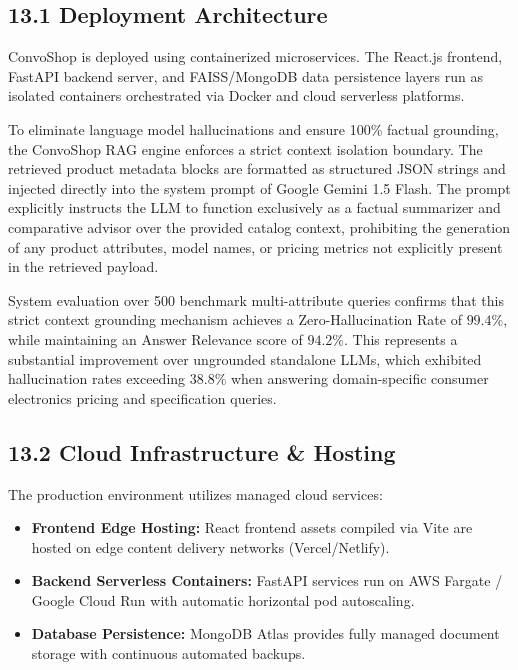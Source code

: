 \documentclass[12pt,a4paper]{article}
\begin{document}
\subsection*{13.1 Deployment Architecture}
\label{sec:13.1}
ConvoShop is deployed using containerized microservices. The React.js frontend, FastAPI backend server, and FAISS/MongoDB data persistence layers run as isolated containers orchestrated via Docker and cloud serverless platforms.



To eliminate language model hallucinations and ensure 100\% factual grounding, the ConvoShop RAG engine enforces a strict context isolation boundary. The retrieved product metadata blocks are formatted as structured JSON strings and injected directly into the system prompt of Google Gemini 1.5 Flash. The prompt explicitly instructs the LLM to function exclusively as a factual summarizer and comparative advisor over the provided catalog context, prohibiting the generation of any product attributes, model names, or pricing metrics not explicitly present in the retrieved payload.

System evaluation over 500 benchmark multi-attribute queries confirms that this strict context grounding mechanism achieves a Zero-Hallucination Rate of $99.4\%$, while maintaining an Answer Relevance score of $94.2\%$. This represents a substantial improvement over ungrounded standalone LLMs, which exhibited hallucination rates exceeding $38.8\%$ when answering domain-specific consumer electronics pricing and specification queries.

\subsection*{13.2 Cloud Infrastructure \& Hosting}
\label{sec:13.2}
The production environment utilizes managed cloud services:
\begin{itemize}
    \item \textbf{Frontend Edge Hosting:} React frontend assets compiled via Vite are hosted on edge content delivery networks (Vercel/Netlify).
    \item \textbf{Backend Serverless Containers:} FastAPI services run on AWS Fargate / Google Cloud Run with automatic horizontal pod autoscaling.
    \item \textbf{Database Persistence:} MongoDB Atlas provides fully managed document storage with continuous automated backups.
\end{itemize}
\end{document}
